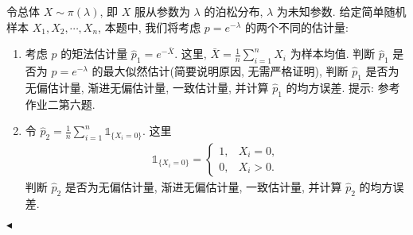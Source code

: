 \documentclass[11pt]{article}
\newenvironment{problem}[2][Problem]{\begin{trivlist}
    \item[\hskip \labelsep {\bfseries #1}\hskip \labelsep {\bfseries #2.}]\songti}{\hfill$\blacktriangleleft$\end{trivlist}}
\newcommand\1{\mathds{1}}
\begin{document}
\begin{problem}{3}
    令总体 $X\sim \pi(\lambda)$, 即 $X$ 服从参数为 $\lambda$ 的泊松分布, $\lambda$ 为未知参数. 给定简单随机样本 $X_1, X_2, \cdots, X_n$, 
    本题中, 我们将考虑 $p = e^{-\lambda}$ 的两个不同的估计量:
    \begin{enumerate}[label=(\arabic*)]
        \item 考虑 $p$ 的矩法估计量 $\hat{p}_1 = e^{-\bar{X}}$. 这里, $\bar{X} = \frac{1}{n}\sum_{i=1}^n X_i$ 为样本均值. 判断 $\hat{p}_1$ 是否为 $p = e^{-\lambda}$ 的最大似然估计(简要说明原因, 无需严格证明),
        判断 $\hat{p}_1$ 是否为无偏估计量, 渐进无偏估计量, 一致估计量, 并计算 $\hat{p}_1$ 的均方误差. {\kaishu 提示: 参考作业二第六题.}
        \item 令 $\hat{p}_2 = \frac{1}{n}\sum_{i=1}^n \1_{\{X_i = 0\}}$. 这里
        \begin{align*}
            \1_{\{X_i = 0\}} = \begin{cases}
                1, & X_i = 0,\\
                0, & X_i > 0.
            \end{cases}
        \end{align*}
        判断 $\hat{p}_2$ 是否为无偏估计量, 渐进无偏估计量, 一致估计量, 并计算 $\hat{p}_2$ 的均方误差.
    \end{enumerate}
\end{problem}
\end{document}
